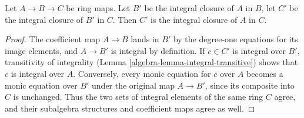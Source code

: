 \begin{lemma}
\label{editorial-source-lemma-integral-closure-transitive}
Let $A \to B \to C$ be ring maps.
Let $B'$ be the integral closure of $A$ in $B$,
let $C'$ be the integral closure of $B'$ in $C$. Then
$C'$ is the integral closure of $A$ in $C$.
\end{lemma}

\begin{proof}
The coefficient map $A\to B$ lands in $B'$ by the degree-one
equations for its image elements, and $A\to B'$ is integral by
definition. If $c\in C'$ is integral over $B'$, transitivity of
integrality (Lemma \ref{algebra-lemma-integral-transitive}) shows that $c$
is integral over $A$. Conversely, every monic equation for $c$
over $A$ becomes a monic equation over $B'$ under the original
map $A\to B'$, since its composite into $C$ is unchanged.
Thus the two sets of integral elements of the same ring $C$ agree,
and their subalgebra structures and coefficient maps agree as well.
\end{proof}
